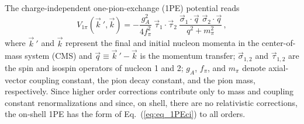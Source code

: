 The charge-independent one-pion-exchange (1PE) potential reads
\begin{equation}
V_{1\pi} ({\vec k}~', \vec k) = -
\frac{g_A^2}{4f_\pi^2} \: {\vec \tau}_1 \cdot {\vec \tau}_2 \: \frac{
  \vec \sigma_1 \cdot \vec q \,\, \vec \sigma_2 \cdot \vec q} {q^2 +
  m_\pi^2} \,,
\label{eq:eq_1PEci}
\end{equation}
where ${\vec k}~'$ and $\vec k$ represent the final and initial
nucleon momenta in the center-of-mass system (CMS) and $\vec q \equiv
{\vec k}~' - \vec k$ is the momentum transfer; $\vec \sigma_{1,2}$ and
$\vec \tau_{1,2}$ are the spin and isospin operators of nucleon 1 and
2; $g_A$, $f_\pi$, and $m_\pi$ denote axial-vector coupling constant,
the pion decay constant, and the pion mass, respectively.  Since
higher order corrections contribute only to mass and coupling constant
renormalizations and since, on shell, there are no relativistic
corrections, the on-shell 1PE has the form of Eq.~(\ref{eq:eq_1PEci})
to all orders.

